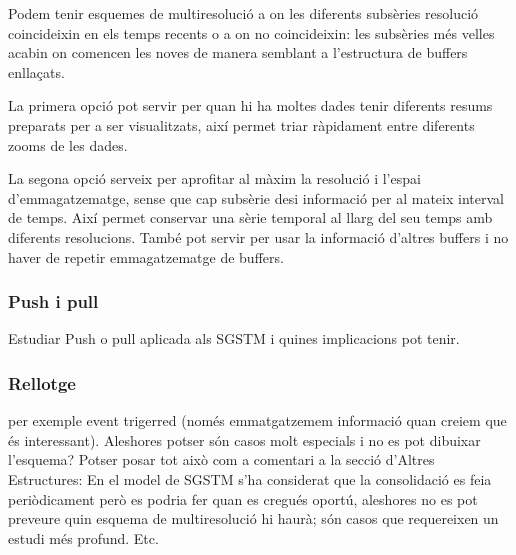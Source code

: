 Podem tenir esquemes de multiresolució a on les diferents subsèries
resolució coincideixin en els temps recents o a on no coincideixin:
les subsèries més velles acabin on comencen les noves de manera
semblant a l'estructura de buffers enllaçats.

La primera opció pot servir per quan hi ha moltes dades tenir diferents resums preparats per a ser visualitzats, així permet triar ràpidament entre diferents zooms de les dades.

La segona opció serveix per aprofitar al màxim la resolució i l'espai d'emmagatzematge, sense que cap subsèrie desi informació per al mateix interval de temps. Així permet conservar una sèrie temporal al llarg del seu temps amb diferents resolucions. També pot servir per usar la informació d'altres buffers i no haver de repetir emmagatzematge de buffers.









\subsubsection{Push i pull}

Estudiar Push o pull aplicada als SGSTM i quines implicacions pot tenir.


\subsubsection{Rellotge}




per exemple event trigerred (només emmatgatzemem informació quan creiem que és interessant). Aleshores potser són casos molt especials i no es pot dibuixar l'esquema? Potser posar tot això com a comentari a la secció d'Altres Estructures: En el model de \gls{SGSTM} s'ha considerat que la consolidació es feia periòdicament però es podria fer quan es cregués oportú, aleshores no es pot preveure quin esquema de multiresolució hi haurà; són casos que requereixen un estudi més profund. Etc. 


